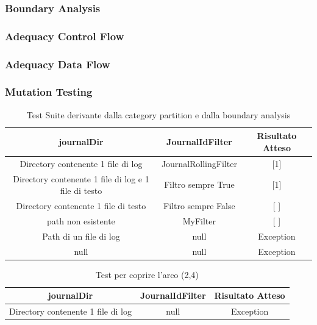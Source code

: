 \documentclass[12pt, a4paper]{article}
\begin{document}
\subsubsection{Boundary Analysis}
\subsubsection{Adequacy Control Flow}
\subsubsection{Adequacy Data Flow}
\subsubsection{Mutation Testing}














\begin{table}[ht]
  \centering
  \caption[Journal: Test Suite - Category Partition]{Test Suite derivante dalla category partition e dalla boundary analysis}
  \begin{tabular}{|c|c|c|}
  \hline
  journalDir & JournalIdFilter & Risultato Atteso \\
  \hline
  {Directory contenente 1 file di log} & JournalRollingFilter & [1] \\
  {Directory contenente 1 file di log e 1 file di testo} & Filtro sempre True & [1] \\
  {Directory contenente 1 file di testo} & Filtro sempre False & [ ] \\
  {path non esistente} & MyFilter & [ ] \\
  {Path di un file di log} & null & Exception \\
  null & null & Exception \\
  \hline
  \end{tabular}
  \label{tab:categoryPartition1ListJournalIds}
\end{table}

\begin{table}[ht]
  \centering
  \caption[Journal: Test Suite - Adequacy Control Flow 1]{Test per coprire l'arco (2,4)}
  \begin{tabular}{|c|c|c|}
    \hline
journalDir & JournalIdFilter & Risultato Atteso \\
  \hline
    {Directory contenente 1 file di log} & null & Exception \\
    \hline
  \end{tabular}
  \label{tab:ACF1ListJournalIds}
\end{table}
\end{document}
